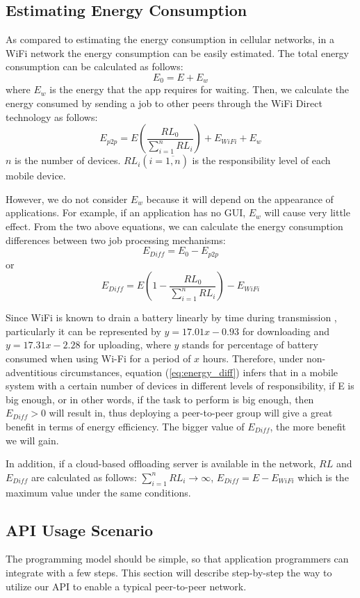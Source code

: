 \documentclass{sig-alternate}[10pt]
\begin{document}
\subsection{Estimating Energy Consumption}
As compared to estimating the energy consumption in cellular networks, in a WiFi network the energy consumption can be easily estimated. The total energy consumption can be calculated as follows:
$$E_{0} = E + E_{w}$$
\noindent where $E_{w}$ is the energy that the app requires for waiting. Then, we calculate the energy consumed by sending a job to other peers through the WiFi Direct technology as follows:
$$E_{p2p} = E(\frac{RL_{0}}{\sum_{i = 1}^{n}{RL_{i}}}) + E_{WiFi} + E_{w}$$ 
\noindent $n$ is the number of devices. $RL_{i} (i = \overline{1,n})$ is the responsibility level of each mobile device. 

However, we do not consider $E_{w}$ because it will depend on the appearance of applications. For example, if an application has no GUI, $E_{w}$ will cause very little effect. From the two above equations, we can calculate the energy consumption differences between two job processing mechanisms:
$$E_{Diff} = E_{0} - E_{p2p}$$ 
or 
\begin{equation}
\label{eq:energy_diff}
E_{Diff} = E(1 - \frac{RL_{0}}{\sum_{i=1}^{n}{RL_{i}}}) - E_{WiFi}
\end{equation}

Since WiFi is known to drain a battery linearly by time during transmission \cite{wifi_energy}, particularly it can be represented by $y = 17.01x - 0.93$ for downloading and $y = 17.31x - 2.28$ for uploading, where $y$ stands for percentage of battery consumed when using Wi-Fi for a period of $x$ hours. Therefore, under non-adventitious circumstances, equation (\ref{eq:energy_diff}) infers that in a mobile system with a certain number of devices in different levels of responsibility, if E is big enough, or in other words, if the task to perform is big enough, then $E_{Diff} > 0$ will result in, thus deploying a peer-to-peer group will give a great benefit in terms of energy efficiency. The bigger value of $E_{Diff}$, the more benefit we will gain. 

In addition, if a cloud-based offloading server is available in the network, $RL$ and $E_{Diff}$ are calculated as follows: $\sum_{i=1}^{n}{RL_{i}} \rightarrow \infty$, $E_{Diff} = E - E_{WiFi}$ which is the maximum value under the same conditions.

\subsection{API Usage Scenario}
The programming model should be simple, so that application programmers can integrate with a few steps. This section will describe step-by-step the way to utilize our API to enable a typical peer-to-peer network.
\end{document}
